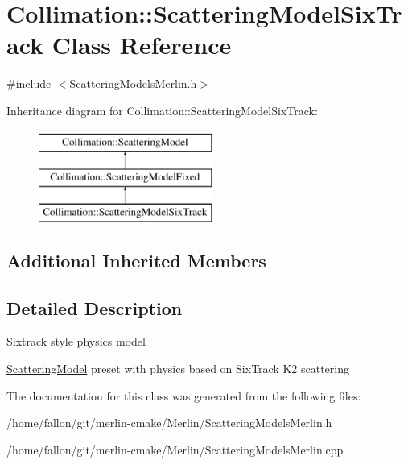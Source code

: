 \hypertarget{classCollimation_1_1ScatteringModelSixTrack}{}\section{Collimation\+:\+:Scattering\+Model\+Six\+Track Class Reference}
\label{classCollimation_1_1ScatteringModelSixTrack}


{\ttfamily \#include $<$Scattering\+Models\+Merlin.\+h$>$}

Inheritance diagram for Collimation\+:\+:Scattering\+Model\+Six\+Track\+:\begin{figure}[H]
\begin{center}
\leavevmode
\includegraphics[height=3.000000cm]{classCollimation_1_1ScatteringModelSixTrack}
\end{center}
\end{figure}
\subsection*{Additional Inherited Members}


\subsection{Detailed Description}
Sixtrack style physics model

\hyperlink{classCollimation_1_1ScatteringModel}{Scattering\+Model} preset with physics based on Six\+Track K2 scattering 

The documentation for this class was generated from the following files\+:\begin{DoxyCompactItemize}
\item 
/home/fallon/git/merlin-\/cmake/\+Merlin/Scattering\+Models\+Merlin.\+h\item 
/home/fallon/git/merlin-\/cmake/\+Merlin/Scattering\+Models\+Merlin.\+cpp\end{DoxyCompactItemize}
